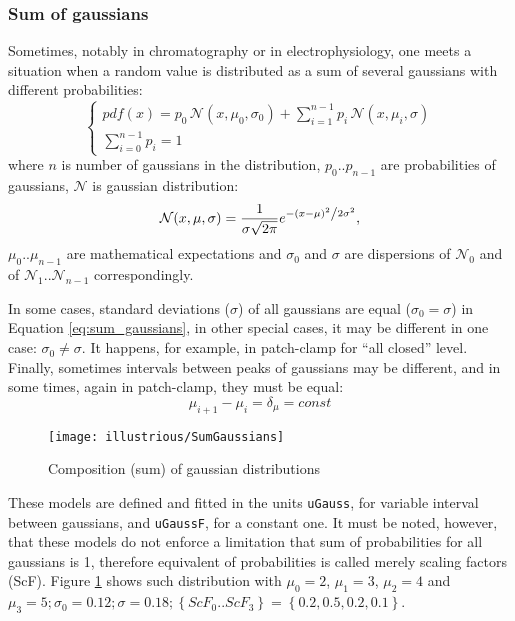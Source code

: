 \documentclass[12pt,a4paper,oneside]{article}
\newcommand{\code}[1]{\texttt{#1}}
\begin{document}
\subsubsection{Sum of gaussians}
Sometimes, notably in chromatography or in electrophysiology, one meets a situation when a random value is distributed as a sum of several gaussians with different probabilities:
\begin{equation}
	\label{eq:sum_gaussians}
	\begin{cases}
		pdf(x)=p_0\,\mathcal{N}(x,\mu_0,\sigma_0)+\sum\limits_{i=1}^{n-1}p_{i}\,\mathcal{N}(x,\mu_i,\sigma) \\
		\sum\limits_{i=0}^{n-1}p_i=1 \,
	\end{cases}
\end{equation}
where $n$ is number of gaussians in the distribution, $p_0..p_{n-1}$ are probabilities of gaussians, $\mathcal{N}$ is gaussian distribution:
\begin{equation}
	\label{eq:gaussian}
	\mathcal{N}(x,\mu,\sigma)=\frac{1}{{\sigma \sqrt {2\pi } }}e^{{{ - \left( {x - \mu } \right)^2 } \mathord{\left/ {\vphantom {{ - \left( {x - \mu } \right)^2 } {2\sigma ^2 }}} \right. \kern-\nulldelimiterspace} {2\sigma ^2 }}},
\end{equation}
$\mu_0..\mu_{n-1}$ are mathematical expectations and $\sigma_0$ and $\sigma$ are dispersions of $\mathcal{N}_0$ and of $\mathcal{N}_1..\mathcal{N}_{n-1}$ correspondingly.
 
In some cases, standard deviations ($\sigma$) of all gaussians are equal ($\sigma_0 = \sigma$) in Equation \ref{eq:sum_gaussians}, in other special cases, it may be different in one case: $\sigma_0 \ne \sigma$. It happens, for example, in patch-clamp for ``all closed'' level. Finally, sometimes intervals between peaks of gaussians may be different, and in some times, again in patch-clamp, they must be equal: 
\begin{equation}\label{eq:constdelta}
\mu_{i+1} - \mu_{i} = \delta_{\mu}=const
\end{equation}
\begin{figure}[tb]
	\centering
	\texttt{[image: illustrious/SumGaussians]}
	\caption{Composition (sum) of gaussian distributions}
	\label{fig:sumgaussians}
\end{figure}

These models are defined and fitted in the units \code{uGauss}, for variable interval between gaussians, and \code{uGaussF}, for a constant one. It must be noted, however, that these models do not enforce a limitation that sum of probabilities for all gaussians is 1, therefore equivalent of probabilities is called merely scaling factors (ScF).
Figure \ref{fig:sumgaussians} shows such distribution with $\mu_0 = 2$, $\mu_1 = 3$, $\mu_2 = 4$ and $\mu_3 = 5; \sigma_0 = 0.12; \sigma = 0.18; \left\lbrace ScF_0..ScF_3\right\rbrace = \left\lbrace 0.2,0.5,0.2,0.1\right\rbrace $.
\end{document}
